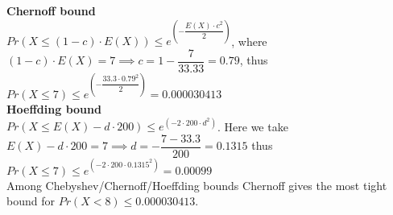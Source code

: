 \textbf{Chernoff bound}\\
$Pr(X \leq (1-c)\cdot E(X)) \leq e^{\left(-\dfrac{E(X)\cdot c^2}{2}\right)}$, where $(1-c)\cdot E(X) = 7 \implies c = 1 - \dfrac{7}{33.33} = 0.79$, thus $Pr(X \leq 7) \leq e^{\left(-\dfrac{33.3\cdot 0.79^2}{2}\right)} = 0.000030413$\\

\textbf{Hoeffding bound}\\
$Pr(X \leq E(X) - d\cdot 200) \leq e^{(-2\cdot 200 \cdot d^2)}$. Here we take $E(X) - d\cdot 200 = 7 \implies d = -\dfrac{7-33.3}{200} = 0.1315$ thus $Pr(X \leq 7) \leq e^{(-2\cdot 200 \cdot 0.1315^2)} = 0.00099$\\

Among Chebyshev/Chernoff/Hoeffding bounds Chernoff gives the most tight bound for $Pr(X<8) \leq 0.000030413$.
